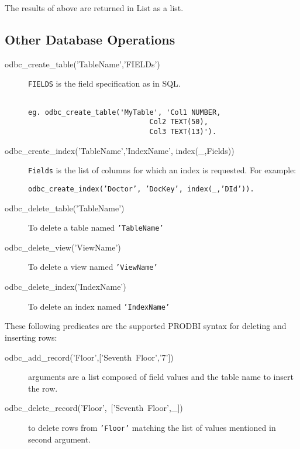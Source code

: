 The results of above are returned in List as a list.

\subsection{Other Database Operations}

\begin{description}

\item[odbc\_create\_table('TableName','FIELDs')]
        {\tt FIELDS} is the field specification as in SQL.
\begin{verbatim}

eg. odbc_create_table('MyTable', 'Col1 NUMBER,
                             Col2 TEXT(50),
                             Col3 TEXT(13)').
\end{verbatim}


\item[odbc\_create\_index('TableName','IndexName', index(\_,Fields))]
        {\tt Fields} is the list of columns for which an index
        is requested.  For example:
\begin{center}

{\tt odbc\_create\_index('Doctor', 'DocKey', index(\_,'DId')).}
\end{center}

\item[odbc\_delete\_table('TableName')] To delete a table named {\tt 'TableName'}

\item[odbc\_delete\_view('ViewName')] To delete a view named {\tt 'ViewName'}

\item[odbc\_delete\_index('IndexName')] To delete an index named {\tt 'IndexName'}
\end{description}

These following predicates are the supported PRODBI syntax for deleting and 
inserting rows:
\begin{description}

\item[\mbox{odbc\_add\_record('Floor',['Seventh Floor','7'])}]
         arguments are a list composed of field values and the table name to
         insert the row.

\item[\mbox{odbc\_delete\_record('Floor', ['Seventh Floor',\_])}]
         to delete rows from {\tt 'Floor'} matching the list of values mentioned in
         second argument. 
\end{description}

